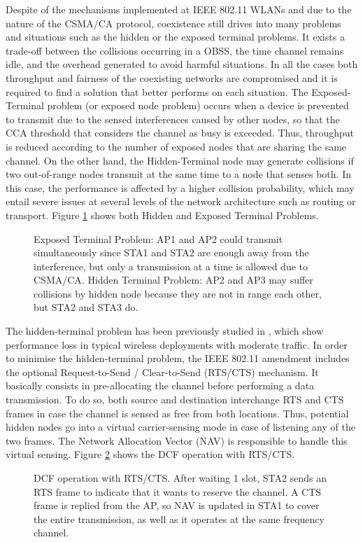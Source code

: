 \documentclass[12pt, a4paper,twoside]{tesi_upf}
\begin{document}
			Despite of the mechanisms implemented at IEEE 802.11 WLANs and due to the nature of the CSMA/CA protocol, coexistence still drives into many problems and situations such as the hidden or the exposed terminal problems. It exists a trade-off between the collisions occurring in a OBSS, the time channel remains idle, and the overhead generated to avoid harmful situations. In all the cases both throughput and fairness of the coexisting networks are compromised and it is required to find a solution that better performs on each situation.	The Exposed-Terminal problem (or exposed node problem) occurs when a device is prevented to transmit due to the sensed interferences caused by other nodes, so that the CCA threshold that considers the channel as busy is exceeded. Thus, throughput is reduced according to the number of exposed nodes that are sharing the same channel. On the other hand, the Hidden-Terminal node may generate collisions if two out-of-range nodes transmit at the same time to a node that senses both. In this case, the performance is affected by a higher collision probability, which may entail severe issues at several levels of the network architecture such as routing or transport. Figure \ref{fig:hidden_exposed} shows both Hidden and Exposed Terminal Problems.					
			\begin{figure}[h!]
				\centering
				\caption{Exposed Terminal Problem: AP1 and AP2 could transmit simultaneously since STA1 and STA2 are enough away from the interference, but only a transmission at a time is allowed due to CSMA/CA. Hidden Terminal Problem: AP2 and AP3 may suffer collisions by hidden node because they are not in range each other, but STA2 and STA3 do.}
				\label{fig:hidden_exposed}
			\end{figure}		
			
			The hidden-terminal problem has been previously studied in \cite{ekici2008ieee, jang2012ieee}, which show performance loss in typical wireless deployments with moderate traffic. In order to minimise the hidden-terminal problem, the IEEE 802.11 amendment includes the optional Request-to-Send / Clear-to-Send (RTS/CTS) mechanism. It basically consists in pre-allocating the channel before performing a data transmission. To do so, both source and destination interchange RTS and CTS frames in case the channel is sensed as free from both locations. Thus, potential hidden nodes go into a virtual carrier-sensing mode in case of listening any of the two frames. The Network Allocation Vector (NAV) is responsible to handle this virtual sensing. Figure \ref{fig:dcf_operation} shows the DCF operation with RTS/CTS.					
			\begin{figure}[h!]
				\centering
				\caption{DCF operation with RTS/CTS. After waiting 1 slot, STA2 sends an RTS frame to indicate that it wants to reserve the channel. A CTS frame is replied from the AP, so NAV is updated in STA1 to cover the entire transmission, as well as it operates at the same frequency channel.}
				\label{fig:dcf_operation}
			\end{figure}
		
\end{document}
